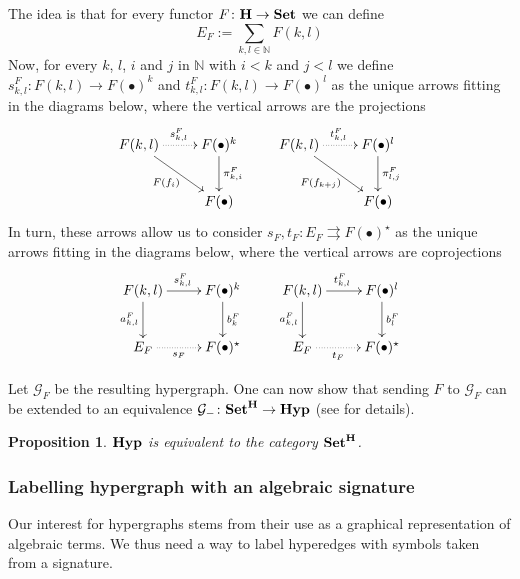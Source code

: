 \documentclass[a4paper,UKenglish,cleveref,pdftex,amsthm,thm-restate,numberwithinsect]{cas-sc}
\theoremstyle{plain}
\newtheorem{proposition}[theorem]{Proposition}
\theoremstyle{definition}
\newcommand{\Set}{\mathbf{Set}}
\newcommand{\catname}[1]{\textbf{\textup{#1}}}
\newcommand{\hyp}{\catname{Hyp}}
\begin{document}
The idea is that for every functor $F\colon \catname{H}\to \catname{Set}$ we can define
\[E_F:=\sum_{k,l\in \mathbb{N}}F(k,l)\]
%
Now, for every $k$, $l$, $i$ and $j$ in $\mathbb{N}$ with $i< k$ and $j< l$ we define $s^F_{k,l}\colon F(k,l)\to F(\bullet)^k$ and  $t^F_{k,l}\colon F(k,l)\to F(\bullet)^l$ as the unique arrows fitting in the diagrams below, where the vertical arrows are the projections
\[\xymatrix{F(k,l)  \ar@{.>}[r]^{s^F_{k,l}} \ar[dr]_{F(f_i)}& F(\bullet)^{k} \ar[d]^{\pi^F_{k,i}} & F(k,l) \ar@{.>}[r]^{t^F_{k,l}} \ar[dr]_{F(f_{k+j})} & F(\bullet)^{l} \ar[d]^{\pi^F_{l,j}} \\ & F(\bullet) && F(\bullet)}\]
%
In turn, these arrows allow us to consider
$s_F, t_F\colon E_F\rightrightarrows F(\bullet)^{\star}$ as the unique arrows fitting in the diagrams below, where the vertical arrows are coprojections
\[\xymatrix{F(k,l) \ar[d]_{a^F_{k,l}}  \ar[r]^{s^{F}_{k,l}}& F(\bullet)^{k} \ar[d]^{b^F_{k}} & F(k,l) \ar[d]_{a^F_{k,l}}  \ar[r]^{t^{F}_{k,l}}& F(\bullet)^{l} \ar[d]^{b^F_{l}}\\ E_F \ar@{.>}[r]_-{s_F}& F(\bullet)^\star & E_F \ar@{.>}[r]_-{t_F}& F(\bullet)^\star}\]

Let $\mathcal{G}_F$ be the resulting hypergraph. One can now show that  sending $F$ to $\mathcal{G}_F$ can be extended to an equivalence $\mathcal{G}_{-}\colon \Set^{\catname{H}}\to \hyp$ (see \cite{castelnovo2023thesis,CastelnovoGM24} for details).


\begin{proposition}
	$\hyp$ is equivalent to the category $\Set^{\catname{H}}$.
\end{proposition}
\fi

\subsubsection{Labelling hypergraph with an algebraic signature}\label{sssect:hyp_alg_sign}

Our interest for hypergraphs stems from their use as a graphical representation of algebraic terms. We thus need a way to label hyperedges with symbols taken from a signature.
\end{document}
